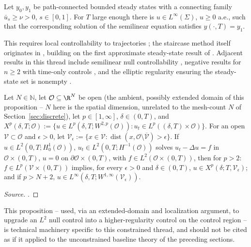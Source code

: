 \begin{theorem}
  Let $y_0,y_1$ be path-connected bounded steady states with a connecting
  family $\bar u_s \ge \nu > 0$, $s\in[0,1]$. For $T$ large enough there is
  $u \in L^\infty(\Sigma)$, $u\ge0$ a.e., such that the corresponding solution
  of the semilinear equation satisfies $y(\cdot,T)=y_1$.
\end{theorem}
This requires local controllability to trajectories
\citep[Lem.~2.1]{pighin2017controllability}; the staircase method itself
originates in \citet{coron2004global}, building on the first approximate
steady-state result of \citet{schmidt1980boundary}. Adjacent results in this
thread include semilinear null controllability
\citep{fernandez1997null,emanuilov1993boundary}, negative results for
$n\ge2$ with time-only controls \citep{chitour2005conditions,martin2016reachable},
and the elliptic regularity ensuring the steady-state set is nonempty
\citep{gilbarg1977elliptic}.

\begin{proposition}
  \label{prop:hidden-regularity}
  Let $N\in\mathbb{N}$, let $\mathcal{O}\subseteq\R^N$ be open (the ambient,
  possibly extended domain of this proposition -- $N$ here is the spatial
  dimension, unrelated to the mesh-count $N$ of Section~\ref{sec:discrete}),
  let $p\in[1,\infty]$, $\delta\in(0,T)$, and
  $X^p(\delta,T;\mathcal{O}) := \{u \in L^p(\delta,T;W^{2,p}(\mathcal{O})) :
  u_t \in L^p((\delta,T)\times\mathcal{O})\}$. For an open
  $\mathcal{V}\subset\mathcal{O}$ and $\epsilon>0$, let
  $\mathcal{V}_\epsilon := \{x\in\mathcal{V} :
  \operatorname{dist}(x,\mathcal{O}\setminus\overline{\mathcal V})>\epsilon\}$.
  If $u\in L^2(0,T;H^1_0(\mathcal O))$, $u_t\in L^2(0,T;H^{-1}(\mathcal O))$
  solves $u_t-\Delta u = f$ in $\mathcal O\times(0,T)$, $u=0$ on
  $\partial\mathcal O\times(0,T)$, with $f\in L^2(\mathcal O\times(0,T))$,
  then for $p>2$: $f\in L^p(\mathcal V\times(0,T))$ implies, for every
  $\epsilon>0$ and $\delta\in(0,T)$, $u \in X^p(\delta;T,\mathcal V_\epsilon)$;
  and if $p>N+2$, $u \in L^\infty(\delta,T;W^{1,\infty}(\mathcal V_\epsilon))$.
\end{proposition}
\begin{proof}[Source]
  \citet[Prop.~4.2]{gonzalez2007some}.
\end{proof}

This proposition -- used, via an extended-domain and localization argument,
to upgrade an $L^2$ null control into a higher-regularity control on the
control region -- is technical machinery specific to this constrained
thread, and should not be cited as if it applied to the unconstrained
baseline theory of the preceding sections.
